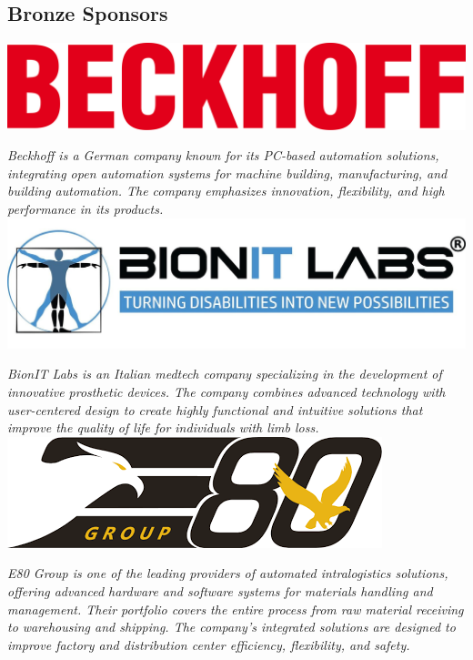 \documentclass[
	openany, %
	parskip=full, %
	12pt, %
	a4paper, %
]{conferencebooklet} %
\begin{document}
\begin{multicols*}{2}
    \subsection{Bronze Sponsors}    

    \hfill\includegraphics[width=\sponsorscaling\linewidth]{logos/beckhoff.png}\hspace*{\fill}
    
    \textit{Beckhoff is a German company known for its PC-based automation solutions, integrating open automation systems for machine building, manufacturing, and building automation. The company emphasizes innovation, flexibility, and high performance in its products.} \\

    \hfill\includegraphics[width=\sponsorscaling\linewidth]{logos/bionit.jpg}\hspace*{\fill}
    
    \textit{BionIT Labs is an Italian medtech company specializing in the development of innovative prosthetic devices. The company combines advanced technology with user-centered design to create highly functional and intuitive solutions that improve the quality of life for individuals with limb loss.} \\

    \hfill\includegraphics[width=\sponsorscaling\linewidth]{logos/e80.png}\hspace*{\fill}

    \textit{E80 Group is one of the leading providers of automated intralogistics solutions, offering advanced hardware and software systems for materials handling and management. Their portfolio covers the entire process from raw material receiving to warehousing and shipping. The company's integrated solutions are designed to improve factory and distribution center efficiency, flexibility, and safety.} \\


\end{multicols*}
\end{document}
